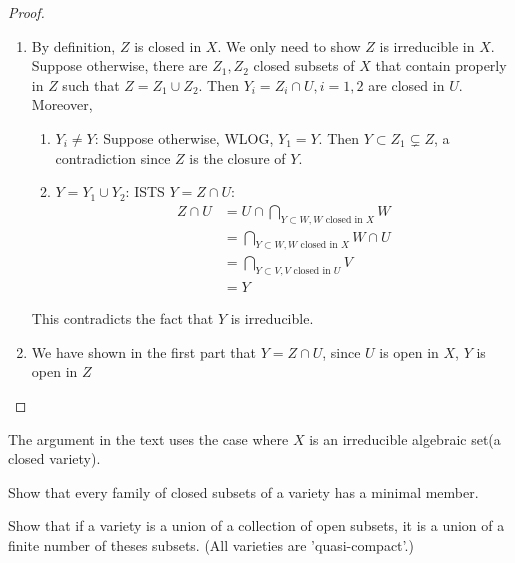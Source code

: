 \documentclass{solution}
\begin{document}
\begin{proof}
    \begin{enumerate}
        \item By definition, $Z$ is closed in $X$. We only need to show $Z$ is irreducible in $X$. Suppose otherwise, there are $Z_1, Z_2$ closed subsets of $X$ that contain properly in $Z$ such that $Z = Z_1 \cup Z_2$. Then $Y_i = Z_i \cap U, i = 1, 2$ are closed in $U$. Moreover,
        \begin{enumerate}
            \item $Y_i \ne Y$: Suppose otherwise, WLOG, $Y_1 = Y$. Then $Y \subset Z_1 \subsetneq Z$, a contradiction since $Z$ is the closure of $Y$.
            \item $Y = Y_1 \cup Y_2$: ISTS $Y = Z \cap U$:
            $$
                \begin{aligned}
                Z \cap U &= U \cap \bigcap\limits_{Y \subset W, W \text{ closed in } X} W \\
                &= \bigcap\limits_{Y \subset W, W \text{ closed in } X} W \cap U\\
                &= \bigcap\limits_{Y \subset V, V \text{ closed in } U} V \\
                &= Y
                \end{aligned}
            $$
        \end{enumerate}
        This contradicts the fact that $Y$ is irreducible.
        \item We have shown in the first part that $Y = Z \cap U$, since $U$ is open in $X$, $Y$ is open in $Z$
    \end{enumerate}
\end{proof}

\begin{remark}
    The argument in the text uses the case where $X$ is an irreducible algebraic set(a closed variety).
\end{remark}

\begin{problem}{6.11}
    \begin{inparaenum}
        \item Show that every family of closed subsets of a variety has a minimal member.
        \item Show that if a variety is a union of a collection of open subsets, it is a union of a finite number of theses subsets. (All varieties are 'quasi-compact'.)
    \end{inparaenum}
\end{problem}
\end{document}
